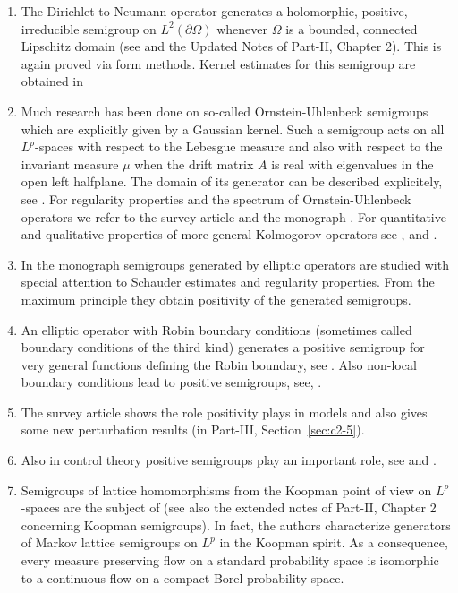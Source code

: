 \begin{enumerate}
\item 
The Dirichlet-to-Neumann operator generates a holomorphic, positive, irreducible semigroup on $L^{2}(\partial\Omega)$ whenever $ \Omega$  is a bounded, connected  Lipschitz domain (see \textcite{zbmath06171001} and the Updated Notes of Part-II, Chapter 2). 
This is again proved via form methods. 
Kernel estimates for this semigroup are obtained in \textcite{zbmath07063341}

\item 
Much research has been done on so-called Ornstein-Uhlenbeck semigroups which are  explicitly given by a Gaussian kernel. 
Such a semigroup acts on all $L^{p}$-spaces with respect to the Lebesgue measure and also with respect to the invariant measure $\mu$ when the drift matrix $A$ is real with eigenvalues in the open left halfplane. 
The domain of its generator can be described explicitely, see \textcite{zbmath02217252}. 
For regularity properties and the spectrum of Ornstein-Uhlenbeck operators we refer to the survey article \textcite{MR4176390} and the monograph \textcite{zbmath06593873}. 
For quantitative and qualitative properties of more general Kolmogorov operators see \textcite{zbmath06593873}, \textcite{zbmath01837428} and \textcite{zbmath01789518}.

\item 
In the monograph \textcite{zbmath07274768} semigroups generated by elliptic operators are studied with special attention to Schauder estimates and
regularity properties. From the maximum principle they obtain positivity
of the generated semigroups.


\item
An elliptic operator with Robin boundary conditions (sometimes called boundary conditions of the third kind) generates a positive semigroup for very general functions defining the Robin boundary, see \textcite{zbmath05551221}. 
Also  non-local boundary conditions lead to positive semigroups,  see, \eg
\textcite{arXiv:2502.03216}. 
 
\item 
The survey article \textcite{zbmath07402424} shows the role positivity plays in models and also gives some new perturbation results (in Part-III, Section~\ref{sec:c2-5}). 


\item Also in control theory positive semigroups play an important role, see \eg \textcite{zbmath04120022} and \textcite{zbmath08056303}. 

\item 
Semigroups of lattice homomorphisms from the Koopman point of view 
on $L^{p}$-spaces are the subject of \textcite{zbmath07036266} (see also the extended notes of Part-II, Chapter 2 concerning Koopman semigroups). In fact, the authors characterize generators of Markov lattice semigroups on $L^{p}$ in the Koopman spirit. As a consequence, every measure preserving flow on a standard probability space is isomorphic to a continuous flow on a compact Borel probability space.



\end{enumerate}
